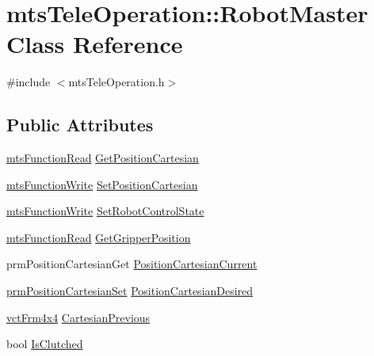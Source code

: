 \hypertarget{classmts_tele_operation_1_1_robot_master}{}\section{mts\+Tele\+Operation\+:\+:Robot\+Master Class Reference}
\label{classmts_tele_operation_1_1_robot_master}


{\ttfamily \#include $<$mts\+Tele\+Operation.\+h$>$}

\subsection*{Public Attributes}
\begin{DoxyCompactItemize}
\item 
\hyperlink{classmts_function_read}{mts\+Function\+Read} \hyperlink{classmts_tele_operation_1_1_robot_master_a636208133cb0148316c243a9eb0c7cf0}{Get\+Position\+Cartesian}
\item 
\hyperlink{classmts_function_write}{mts\+Function\+Write} \hyperlink{classmts_tele_operation_1_1_robot_master_aa770b7c1b750b7b2afc350b60581f9b2}{Set\+Position\+Cartesian}
\item 
\hyperlink{classmts_function_write}{mts\+Function\+Write} \hyperlink{classmts_tele_operation_1_1_robot_master_a11e283aec6cec91955b9fc132b6f4bc8}{Set\+Robot\+Control\+State}
\item 
\hyperlink{classmts_function_read}{mts\+Function\+Read} \hyperlink{classmts_tele_operation_1_1_robot_master_ad3791d4ef807b382f9d1f870225d0b65}{Get\+Gripper\+Position}
\item 
prm\+Position\+Cartesian\+Get \hyperlink{classmts_tele_operation_1_1_robot_master_aa0c188ce05365e7a3a842bb8223eedb5}{Position\+Cartesian\+Current}
\item 
\hyperlink{classprm_position_cartesian_set}{prm\+Position\+Cartesian\+Set} \hyperlink{classmts_tele_operation_1_1_robot_master_a5c1d1ecf363197b5e16e766e186f0273}{Position\+Cartesian\+Desired}
\item 
\hyperlink{vct_transformation_types_8h_a33da47f4deb2556b37a69a2c44b29d75}{vct\+Frm4x4} \hyperlink{classmts_tele_operation_1_1_robot_master_a64a8bdf7b6dc8b6b1dd2ba6eec9fccdf}{Cartesian\+Previous}
\item 
bool \hyperlink{classmts_tele_operation_1_1_robot_master_a5ab0c4355af46b27e084c7e0b9915058}{Is\+Clutched}
\end{DoxyCompactItemize}


